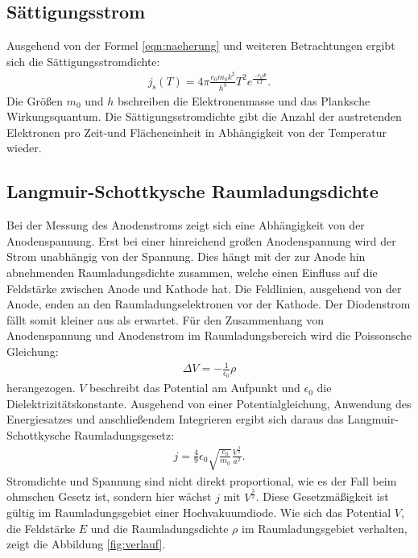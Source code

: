 \subsection{Sättigungsstrom}
Ausgehend von der Formel \eqref{eqn:naeherung} und weiteren Betrachtungen ergibt sich
die Sättigungsstromdichte:
\begin{align}
j_\mathrm{s}(T)=4\pi\frac{e_\mathrm{0} m_\mathrm{0} k^2}{h^3} T^2 e^{\frac{-e_\mathrm{0}\Phi}{kT}} \label{eqn:st}.
\end{align}
Die Größen $m_\mathrm{0}$ und $h$ bschreiben die Elektronenmasse und das Planksche Wirkungsquantum.
Die Sättigungsstromdichte gibt die Anzahl der austretenden Elektronen pro Zeit-und Flächeneinheit
in Abhängigkeit von der Temperatur wieder.

\subsection{Langmuir-Schottkysche Raumladungsdichte}
Bei der Messung des Anodenstroms zeigt sich eine Abhängigkeit von der Anodenspannung.
Erst bei einer hinreichend großen Anodenspannung wird der Strom unabhängig von der Spannung.
Dies hängt mit der zur Anode hin abnehmenden Raumladungsdichte zusammen, welche einen Einfluss
auf die Feldstärke zwischen Anode und Kathode hat. Die Feldlinien, ausgehend von der Anode, enden
an den Raumladungselektronen vor der Kathode. Der Diodenstrom fällt somit kleiner aus als erwartet.
Für den Zusammenhang von Anodenspannung und Anodenstrom im Raumladungsbereich wird die
Poissonsche Gleichung:
\begin{align}
\Delta V =-\frac{1}{\epsilon_\mathrm{0}}\rho
\end{align}
herangezogen. $V$ beschreibt das Potential am Aufpunkt und $\epsilon_\mathrm{0}$ die Dielektrizitätskonstante.
Ausgehend von einer Potentialgleichung, Anwendung des Energiesatzes und anschließendem Integrieren
ergibt sich daraus das Langmuir-Schottkysche Raumladungsgesetz:
\begin{align}
j=\frac{4}{9}\epsilon_\mathrm{0}\sqrt{\frac{e_\mathrm{0}}{m_\mathrm{0}}}\frac{V^{\frac{3}{2}}}{a^2} .\label{eqn:LRS}
\end{align}
Stromdichte und Spannung sind nicht direkt proportional, wie es der Fall beim ohmschen Gesetz ist, sondern
hier wächst $j$ mit $V^{\frac{3}{2}}$. Diese Gesetzmäßigkeit ist gültig im Raumladungsgebiet einer Hochvakuumdiode.
Wie sich das Potential $V$, die Feldstärke $E$ und die Raumladungsdichte $\rho$ im Raumladungsgebiet
verhalten, zeigt die Abbildung \ref{fig:verlauf}.
